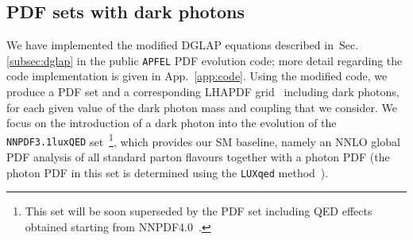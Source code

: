 \documentclass[withindex,glossary]{cam-thesis}
\begin{document}
\subsection{PDF sets with dark photons}

We have implemented the modified DGLAP equations described in~Sec. \ref{subsec:dglap} in the
public \texttt{APFEL} PDF evolution code; more detail regarding the code 
implementation is given in App.~\ref{app:code}. Using
the modified code, we produce a PDF set and a corresponding LHAPDF
grid~\cite{Buckley:2014ana} including dark photons, for each given
value of the dark photon mass and coupling that we consider. 
We focus on the introduction of a dark photon into the evolution of the
{\tt NNPDF3.1luxQED} set~\cite{Bertone:2017bme}\footnote{This
    set will be soon superseded by the PDF set including QED effects
    obtained starting from NNPDF4.0~\cite{Ball:2021leu}.}, which provides our
SM baseline, namely an NNLO
global PDF analysis of all standard parton flavours together with a photon PDF (the photon
PDF in this set is determined using the {\tt LUXqed}
method~\cite{Manohar:2017eqh}).
\end{document}
